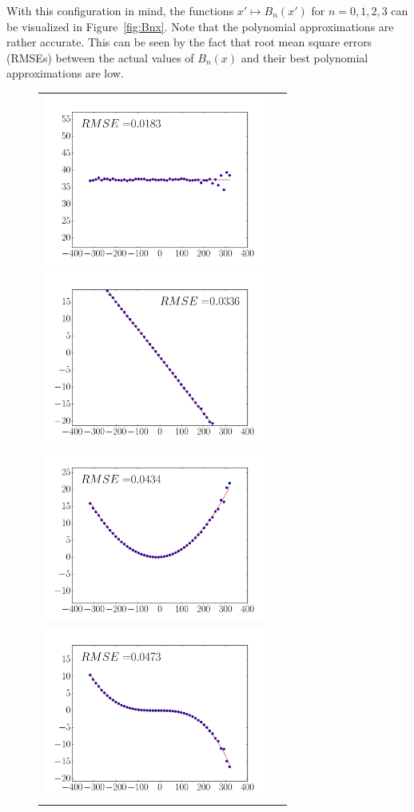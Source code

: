 \documentclass[twocolumn]{IEEEtran}
\numberwithin{equation}{section}
\begin{document}
With this configuration in mind, the functions $x' \mapsto B_n(x')$ for $n = 0,1,2,3$ can be visualized in Figure~\ref{fig:Bnx}. Note that the polynomial approximations are rather accurate. This can be seen by the fact that root mean square errors (RMSEs) between the actual values of $B_n(x)$ and their best polynomial approximations are low.
\begin{figure}[!ht]
	\centering
	\begin{tabular}{cc}
	\includegraphics[width=75mm]{figs/B0.png} \\
	\includegraphics[width=75mm]{figs/B1.png} \\
	\includegraphics[width=75mm]{figs/B2.png} \\
	\includegraphics[width=75mm]{figs/B3.png} 

\end{tabular}
\end{figure}
\end{document}
